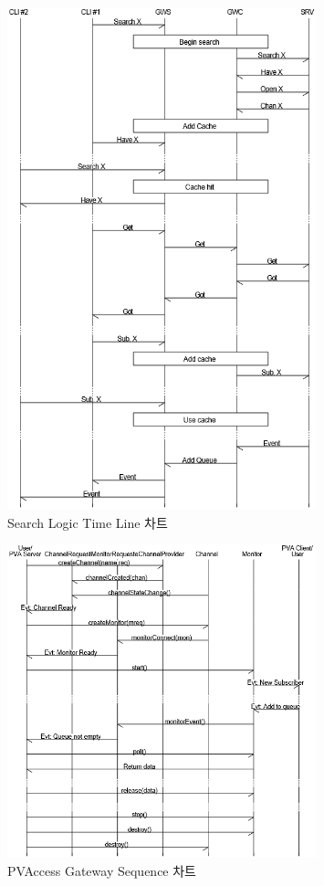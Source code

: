 \documentclass[11pt
  , a4paper
  , article
  , oneside
]{memoir}
\begin{document}
\begin{figure}[!htb]
	\centering
	\includegraphics[width=0.8\textwidth, height=0.6\textheight]{./images/search.png}
	\caption{
		Search Logic Time Line 차트
	}
	\label{fig:search}   
\end{figure}


\begin{figure}[!htb]
	\centering
	\includegraphics[width=0.8\textwidth, height=0.6\textheight]{./images/seqence.png}
	\caption{
		PVAccess Gateway Sequence 차트
	}
	\label{fig:sequence}   
\end{figure}
\end{document}
